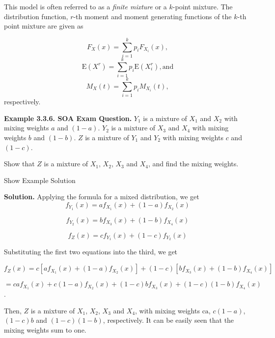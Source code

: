 \documentclass[]{book}
\theoremstyle{definition}
\theoremstyle{definition}
\theoremstyle{definition}
\theoremstyle{remark}
\begin{document}
This model is often referred to as a \emph{finite mixture} or a
\(k\)-point mixture. The distribution function, \(r\)-th moment and
moment generating functions of the \(k\)-th point mixture are given as

\[F_{X}\left( x \right) = \sum_{i = 1}^{k}{p_{i}F_{X_{i}}\left( x \right)},\]
\[\mathrm{E}\left( X^{r} \right) = \sum_{i = 1}^{k}{p_{i}\mathrm{E}\left( X_{i}^{r} \right)}, \text{and}\]
\[M_{X}\left( t \right) = \sum_{i = 1}^{k}{p_{i}M_{X_{i}}\left( t \right)},\]
respectively.

\textbf{Example 3.3.6. SOA Exam Question.} \(Y_{1}\) is a mixture of
\(X_{1}\) and \(X_{2}\) with mixing weights \(a\) and \((1 - a)\).
\(Y_{2}\) is a mixture of \(X_{3}\) and \(X_{4}\) with mixing weights
\(b\) and \((1 - b)\). \(Z\) is a mixture of \(Y_{1}\) and \(Y_{2}\)
with mixing weights \(c\) and \((1 - c)\).

Show that \(Z\) is a mixture of \(X_{1}\), \(X_{2}\), \(X_{3}\) and
\(X_{4}\), and find the mixing weights.

Show Example Solution

\hypertarget{toggleExampleLoss.3.6}{}
\textbf{Solution.} Applying the formula for a mixed distribution, we get
\[f_{Y_{1}}\left( x \right) = af_{X_{1}}\left( x \right) + \left( 1 - a \right)f_{X_{2}}\left( x \right)\]

\[f_{Y_{2}}\left( x \right) = bf_{X_{3}}\left( x \right) + \left( 1 - b \right)f_{X_{4}}\left( x \right)\]

\[f_{Z}\left( x \right) = cf_{Y_{1}}\left( x \right) + \left( 1 - c \right)f_{Y_{2}}\left( x \right)\]

Substituting the first two equations into the third, we get

\[f_{Z}\left( x \right) = c\left\lbrack af_{X_{1}}\left( x \right) + \left( 1 - a \right)f_{X_{2}}\left( x \right) \right\rbrack + \left( 1 - c \right)\left\lbrack bf_{X_{3}}\left( x \right) + \left( 1 - b \right)f_{X_{4}}\left( x \right) \right\rbrack\]

\[= caf_{X_{1}}\left( x \right) + c\left( 1 - a \right)f_{X_{2}}\left( x \right) + \left( 1 - c \right)bf_{X_{3}}\left( x \right) + (1 - c)\left( 1 - b \right)f_{X_{4}}\left( x \right)\].

Then, \(Z\) is a mixture of \(X_{1}\), \(X_{2}\), \(X_{3}\) and
\(X_{4}\), with mixing weights \(\text{ca}\), \(c\left( 1 - a \right)\),
\(\left( 1 - c \right)b\) and \((1 - c)\left( 1 - b \right)\),
respectively. It can be easily seen that the mixing weights sum to one.
\end{document}
